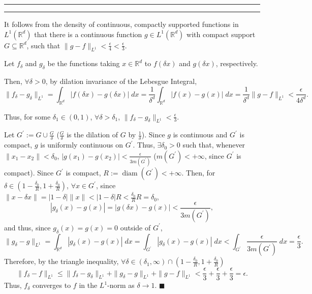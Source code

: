 \documentclass[11pt]{article}
\newcounter{questionCounter}
\newcounter{partCounter}[questionCounter]
\newenvironment{question}[2][\arabic{questionCounter}]{%
    \setcounter{partCounter}{0}%
    \vspace{.25in} \hrule \vspace{0.5em}%
        \noindent{\bf #2}%
    \vspace{0.8em} \hrule \vspace{.10in}%
    \addtocounter{questionCounter}{1}%
}{}
\renewcommand{\qed}{\quad $\blacksquare$}
\newcommand{\R}{\mathbb{R}} %
\newcommand{\diam}[1]{\operatorname{diam} \left( #1 \right)} %
\begin{document}
\begin{question}{Exercise 2}
It follows from the density of continuous, compactly supported functions in
$L^1(\R^d)$ that there is a continuous function $g \in L^1(\R^d)$ with compact
support $G \subseteq \R^d$, such that
$\|g - f\|_{L^1} < \frac{\epsilon}{4} < \frac{\epsilon}{3}$.

Let $f_{\delta}$ and $g_{\delta}$ be the functions taking $x \in \R^d$ to
$f(\delta x)$ and $g(\delta x)$, respectively.

Then, $\forall \delta > 0$, by dilation invariance of the Lebesgue Integral,
\[
\|f_{\delta} - g_{\delta}\|_{L^1}
 = \int_{\R^d} |f(\delta x) - g(\delta x)| \; dx
 = \frac{1}{\delta^d} \int_{\R^d} |f(x) - g(x)| \; dx
 = \frac{1}{\delta^d} \|g - f\|_{L^1}
 < \frac{\epsilon}{4\delta^d}.
\]

Thus, for some $\delta_1 \in (0,1)$, $\forall \delta > \delta_1$,
$\|f_{\delta} - g_{\delta}\|_{L^1} < \frac{\epsilon}{3}$.

Let $G^{\prime} := G \cup \frac{G}{\delta}$ ($\frac{G}{\delta}$ is the
dilation of $G$ by $\frac{1}{\delta}$). Since $g$ is continuous and
$G^{\prime}$ is compact, $g$ is uniformly continuous on $G^{\prime}$. Thus,
$\exists \delta_0 > 0$ such that, whenever $\|x_1 - x_2\| < \delta_0$,
$|g(x_1) - g(x_2)| < \frac{\epsilon}{3m(G^{\prime})}$
($m(G^{\prime}) < +\infty$, since $G^{\prime}$ is compact).
Since $G^{\prime}$ is compact, $R := \diam{G^{\prime}} < +\infty$. Then, for
$\delta \in \left( 1 - \frac{\delta_0}{R}, 1 + \frac{\delta_0}{R} \right)$,
$\forall x \in G^{\prime}$,
since
$\|x - \delta x\|
 = |1 - \delta|\|x\|
 < |1 - \delta| R
 < \frac{\delta_0}{R}R
 = \delta_0$,
\[
|g_\delta(x) - g(x)|
 = |g(\delta x) - g(x)|
 < \frac{\epsilon}{3m(G^{\prime})},
\]
and thus, since $g_\delta(x) = g(x) = 0$ outside of $G^{\prime}$,
\[
\|g_\delta - g\|_{L^1}
 = \int_{\R^d} |g_{\delta}(x) - g(x)| \; dx
 = \int_{G^{\prime}} |g_{\delta}(x) - g(x)| \; dx
 < \int_{G^{\prime}} \frac{\epsilon}{3m(G^{\prime})} \; dx
 = \frac{\epsilon}{3}.
\]
Therefore, by the triangle inequality,
$\forall \delta \in (\delta_1,\infty) \cap
\left( 1 - \frac{\delta_0}{R}, 1 + \frac{\delta_0}{R} \right)$
\[\|f_{\delta} - f\|_{L^1}
 \leq \|f_{\delta} - g_{\delta}\|_{L^1}
    + \|g_{\delta} - g\|_{L^1}
    + \|g - f\|_{L^1}
 < \frac{\epsilon}{3} + \frac{\epsilon}{3} + \frac{\epsilon}{3}
 = \epsilon.
\]
Thus, $f_{\delta}$ converges to $f$ in the $L^1$-norm as
$\delta \rightarrow 1$. \qed
\end{question}
\end{document}
